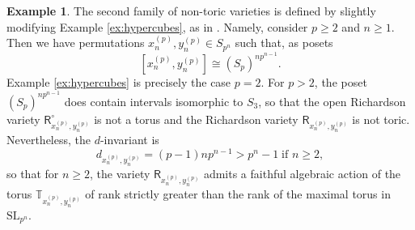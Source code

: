 \documentclass[a4paper, 11pt]{amsart}
\newcommand{\SL}{\mathrm{SL}}
\newcommand{\orich}[1]{\mathsf{R}^{\circ}_{#1}}
\newcommand{\rich}[1]{\mathsf{R}_{#1}}
\newcommand{\dil}[1]{\mathbb{T}_{#1}}
\theoremstyle{definition}
\newtheorem{example}[theorem]{Example}
\begin{document}
\begin{example}
The second family of non-toric varieties is defined by slightly modifying Example \ref{ex:hypercubes}, as in \cite[Section 3.2]{hypercubes}.
Namely, consider $p \geq 2$ and $n \geq 1$. Then we have permutations $x_n^{(p)}, y_n^{(p)} \in S_{p^n}$ such that, as posets
\[
[x_n^{(p)}, y_n^{(p)}] \cong (S_p)^{np^{n-1}}.
\]
Example \ref{ex:hypercubes} is precisely the case $p = 2$. For $p > 2$, the poset $(S_p)^{np^{n-1}}$ does contain intervals isomorphic to $S_3$, so that the open Richardson variety $\orich{x_n^{(p)}, y_n^{(p)}}$ is not a torus and the Richardson variety $\rich{x_n^{(p)}, y_n^{(p)}}$ is not toric. Nevertheless, the $d$-invariant is
\[
d_{x_n^{(p)}, y_n^{(p)}} = (p-1)np^{n-1} > p^{n} - 1 \; \text{if $n \geq 2$},
\]
so that for $n \geq 2$, the variety $\rich{x_n^{(p)}, y_n^{(p)}}$ admits a faithful algebraic action of the torus $\dil{x_n^{(p)}, y_n^{(p)}}$ of rank strictly greater than the rank of the maximal torus in $\SL_{p^n}$. 
\end{example}



\end{document}
